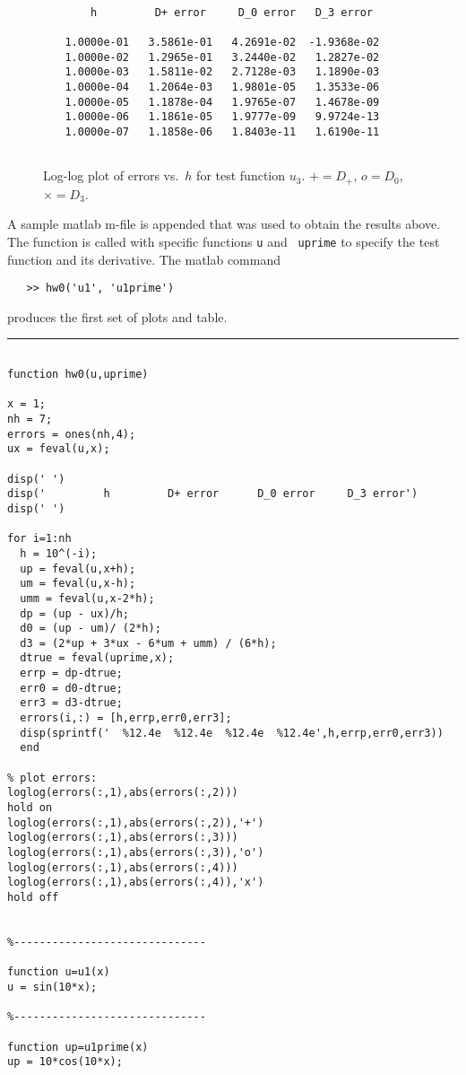 \documentclass{article}
\begin{document}
\begin{verbatim}

             h         D+ error     D_0 error   D_3 error

         1.0000e-01   3.5861e-01   4.2691e-02  -1.9368e-02
         1.0000e-02   1.2965e-01   3.2440e-02   1.2827e-02
         1.0000e-03   1.5811e-02   2.7128e-03   1.1890e-03
         1.0000e-04   1.2064e-03   1.9801e-05   1.3533e-06
         1.0000e-05   1.1878e-04   1.9765e-07   1.4678e-09
         1.0000e-06   1.1861e-05   1.9777e-09   9.9724e-13
         1.0000e-07   1.1858e-06   1.8403e-11   1.6190e-11


\end{verbatim}

\begin{figure}[h]
\hfil{}\hfil
\caption{Log-log plot of errors vs.\ $h$ for test function $u_3$.
$+=D_+$, $o=D_0$, $\times = D_3$.}
\end{figure}


\newpage
A sample matlab m-file is appended that was used to obtain the results
above.  The function is called with specific functions {\tt u} and {\tt
uprime} to specify the test function and its derivative.
The matlab command
\begin{verbatim}
   >> hw0('u1', 'u1prime')
\end{verbatim}
produces the first set of plots and table. 

\vskip 5pt
\hrule
\vskip 5pt

\small
\begin{verbatim}

function hw0(u,uprime)

x = 1;
nh = 7;
errors = ones(nh,4);
ux = feval(u,x);

disp(' ')
disp('         h         D+ error      D_0 error     D_3 error')
disp(' ')

for i=1:nh
  h = 10^(-i);
  up = feval(u,x+h);
  um = feval(u,x-h);
  umm = feval(u,x-2*h);
  dp = (up - ux)/h;
  d0 = (up - um)/ (2*h);
  d3 = (2*up + 3*ux - 6*um + umm) / (6*h);
  dtrue = feval(uprime,x);
  errp = dp-dtrue;
  err0 = d0-dtrue;
  err3 = d3-dtrue;
  errors(i,:) = [h,errp,err0,err3];
  disp(sprintf('  %12.4e  %12.4e  %12.4e  %12.4e',h,errp,err0,err3))
  end

% plot errors:
loglog(errors(:,1),abs(errors(:,2)))
hold on
loglog(errors(:,1),abs(errors(:,2)),'+')
loglog(errors(:,1),abs(errors(:,3)))
loglog(errors(:,1),abs(errors(:,3)),'o')
loglog(errors(:,1),abs(errors(:,4)))
loglog(errors(:,1),abs(errors(:,4)),'x')
hold off


%------------------------------

function u=u1(x)
u = sin(10*x);

%------------------------------

function up=u1prime(x)
up = 10*cos(10*x);

\end{verbatim}
\end{document}
